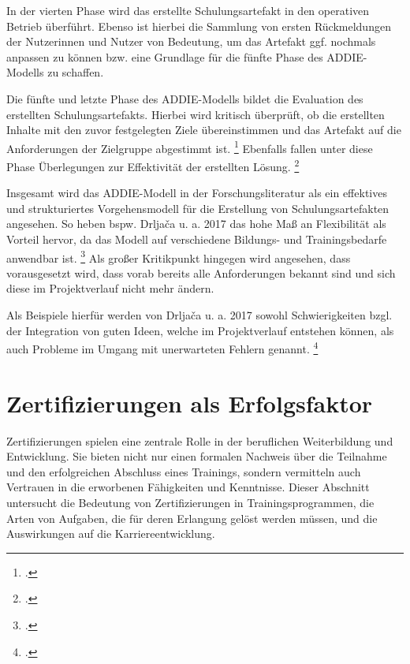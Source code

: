 In der vierten Phase wird das erstellte Schulungsartefakt in den operativen
Betrieb überführt. Ebenso ist hierbei die Sammlung von ersten Rückmeldungen
der Nutzerinnen und Nutzer von Bedeutung, um das Artefakt ggf. nochmals
anpassen zu können bzw. eine Grundlage für die fünfte Phase des \ac{ADDIE}-Modells zu schaffen.

Die fünfte und letzte Phase des \ac{ADDIE}-Modells bildet die Evaluation des erstellten Schulungsartefakts.
Hierbei wird kritisch überprüft, ob die erstellten Inhalte mit den zuvor festgelegten Ziele übereinstimmen und das Artefakt auf die Anforderungen der Zielgruppe abgestimmt ist.
\footcite[Vgl.][437]{allenOverviewEvolutionADDIE2006}
Ebenfalls fallen unter diese Phase Überlegungen zur Effektivität der erstellten Lösung.
\footcite[Vgl.][2]{constancioExtendedADDIEModel2018}

Insgesamt wird das \ac{ADDIE}-Modell in der Forschungsliteratur als ein effektives und strukturiertes Vorgehensmodell für die Erstellung von Schulungsartefakten angesehen.
So heben bspw. Drljača u. a. 2017 das hohe Maß an Flexibilität als Vorteil hervor, da das Modell auf verschiedene Bildungs- und Trainingsbedarfe anwendbar ist.
\footcite[Vgl.][247]{drljacaADDIEModelDevelopment2017}
Als großer Kritikpunkt hingegen wird angesehen, dass vorausgesetzt wird, dass vorab bereits
alle Anforderungen bekannt sind und sich diese im Projektverlauf nicht mehr ändern.

Als Beispiele hierfür werden von Drljača u. a. 2017 sowohl
Schwierigkeiten bzgl. der Integration von guten Ideen, welche
im Projektverlauf entstehen können, als auch Probleme im Umgang
mit unerwarteten Fehlern genannt.
\footcite[Vgl.][246]{drljacaADDIEModelDevelopment2017}


\section{Zertifizierungen als Erfolgsfaktor}
Zertifizierungen spielen eine zentrale Rolle in der beruflichen Weiterbildung und Entwicklung. Sie bieten nicht nur einen formalen Nachweis über die Teilnahme und den erfolgreichen Abschluss eines Trainings, sondern vermitteln auch Vertrauen in die erworbenen Fähigkeiten und Kenntnisse. Dieser Abschnitt untersucht die Bedeutung von Zertifizierungen in Trainingsprogrammen, die Arten von Aufgaben, die für deren Erlangung gelöst werden müssen, und die Auswirkungen auf die Karriereentwicklung. %

